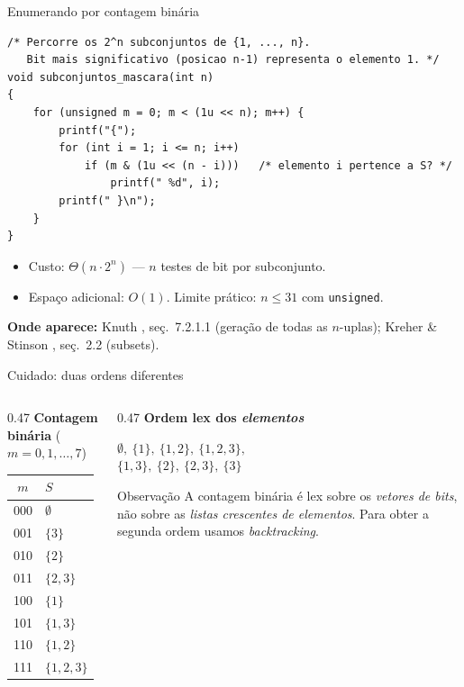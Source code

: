 \documentclass[aspectratio=169]{beamer}
\newcommand{\fonte}[1]{%
  \par\vspace{1pt}%
  {\tiny\color{gray!30!black}\textbf{Onde aparece:} #1\par}}
\begin{document}
\begin{frame}[fragile]{Enumerando por contagem binária}
\begin{lstlisting}[style=estiloC]
/* Percorre os 2^n subconjuntos de {1, ..., n}.
   Bit mais significativo (posicao n-1) representa o elemento 1. */
void subconjuntos_mascara(int n)
{
    for (unsigned m = 0; m < (1u << n); m++) {
        printf("{");
        for (int i = 1; i <= n; i++)
            if (m & (1u << (n - i)))   /* elemento i pertence a S? */
                printf(" %d", i);
        printf(" }\n");
    }
}
\end{lstlisting}
  \begin{itemize}
    \item Custo: $\Theta(n \cdot 2^n)$ --- $n$ testes de bit por subconjunto.
    \item Espaço adicional: $O(1)$. Limite prático: $n \le 31$ com \texttt{unsigned}.
  \end{itemize}
  \fonte{Knuth \cite{knuth2011taocp4a}, seç.~7.2.1.1 (geração de todas as $n$-uplas);
    Kreher \& Stinson \cite{kreher1999combinatorial}, seç.~2.2 (subsets).}
\end{frame}

\begin{frame}{Cuidado: duas ordens diferentes}
  \begin{columns}[T]
    \begin{column}{0.47\textwidth}
      \textbf{Contagem binária} ($m = 0,1,\dots,7$)
      \begin{center}\small
      \begin{tabular}{@{}cl@{}}
        \toprule
        $m$ & $S$ \\
        \midrule
        000 & $\emptyset$ \\
        001 & $\{3\}$ \\
        010 & $\{2\}$ \\
        011 & $\{2,3\}$ \\
        100 & $\{1\}$ \\
        101 & $\{1,3\}$ \\
        110 & $\{1,2\}$ \\
        111 & $\{1,2,3\}$ \\
        \bottomrule
      \end{tabular}
      \end{center}
    \end{column}
    \begin{column}{0.47\textwidth}
      \textbf{Ordem lex dos \emph{elementos}}
      \begin{center}\small
      $\emptyset,\ \{1\},\ \{1,2\},\ \{1,2,3\},$\\
      $\{1,3\},\ \{2\},\ \{2,3\},\ \{3\}$
      \end{center}
      \begin{alertblock}{Observação}
        A contagem binária é lex sobre os \emph{vetores de bits}, não sobre as
        \emph{listas crescentes de elementos}. Para obter a segunda ordem
        usamos \textit{backtracking}.
      \end{alertblock}
    \end{column}
  \end{columns}
\end{frame}
\end{document}
